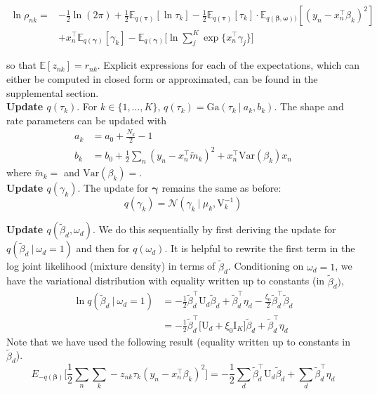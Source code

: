 \documentclass[twoside,11pt]{article}
\newcommand{\tr}{\intercal}
\newcommand\given[1][]{\:#1\vert\:}
\newcommand{\transpose}[1]{#1^{\intercal}}
\newcommand{\nsum}{\sum\limits_{n}}
\newcommand{\ksum}{\sum\limits_{k}}
\newcommand{\boldbeta}{\boldsymbol\beta}
\newcommand{\boldgamma}{\boldsymbol\gamma}
\newcommand{\E}{\mathbb{E}}
\newcommand{\betad}{\tilde{\beta}_d}
\newcommand{\umat}{\mathrm{U}}
\newcommand{\var}[1]{\mathrm{Var}\left(#1\right)}
\begin{document}
\begin{equation} \label{eq:ln_rho_vs}
\begin{split}
 \ln \rho_{nk} = &-\frac{1}{2}\ln(2\pi) + \frac{1}{2} \E_{q(\boldsymbol\tau)}[ \ln \tau_k ] - \frac{1}{2} \E_{q(\boldsymbol\tau)}[\tau_k] \cdot \E_{q(\boldbeta, \boldsymbol\omega))}[(y_n - x_n^{\tr}\beta_k)^2] \\ 
	& + x_n^{\tr}\E_{q(\boldsymbol\gamma)}[\gamma_k] - \E_{q(\boldsymbol\gamma)}\Bigg[\ln \sum_{j}^K \exp \{ x_n^{\tr} \gamma_j \}\Bigg]
\end{split}
\end{equation}

so that $\E[z_{nk}] = r_{nk}$. Explicit expressions for each of the expectations, which can either be computed in closed form or approximated, can be found in the supplemental section. \\


\textbf{Update $q \left(  \tau_k \right)$}. For $k \in \{1, \ldots, K \}$, $q(\tau_k) = \mathrm{Ga}\left( \tau_k \given a_k, b_k \right)$. The shape and rate parameters can be updated with
\begin{align}
	a_k &= a_0 + \frac{N_k}{2} - 1 \label{eq:ak_vs} \\
	b_k &= b_0 + \frac{1}{2} \nsum (y_n -\transpose{x_n} \tilde{m}_k)^2 + \transpose{x_n}\var{\beta_k} x_n \label{eq:bk_vs}
\end{align}
where $\tilde{m}_k = $ and $\var{\beta_k} = $. \\

\textbf{Update $q \left(  \gamma_k \right)$}. The update for $\boldgamma$ remains the same as before:
\begin{equation} \label{optimal_gmama_vs}
	q(\gamma_k) = \mathcal{N} \left( \gamma_k \given \mu_k, \mathrm{V}_k^{-1} \right)
\end{equation}



\textbf{Update $q ( \betad, \omega_d )$}. We do this sequentially by first deriving the update for $q\left(\betad \given \omega_d = 1 \right)$ and then for $q\left( \omega_d \right)$. It is helpful to rewrite the first term in the log joint likelihood (mixture density) in terms of $\betad$. Conditioning on $\omega_d = 1$, we have the variational distribution with equality written up to constants (in $\betad)$, 
\begin{align}
	 \ln q\left(\betad \given \omega_d = 1 \right) &= - \frac{1}{2} \transpose{\betad} \umat_d \betad + \transpose{\betad} \eta_d - \frac{\xi_0}{2} \transpose{\betad} \betad \\
	 &= - \frac{1}{2} \transpose{\betad} \big[ \umat_d +  \xi_0 \mathrm{I}_K\big] \betad + \transpose{\betad} \eta_d \label{eq:ln_q_beta_vs}
\end{align}
Note that we have used the following result (equality written up to constants in $\betad$). 
\begin{equation}
	 E_{-q(\boldbeta)} \Bigg[ \frac{1}{2} \nsum \ksum -z_{nk} \tau_k \left( y_n - \transpose{x_n} \beta_k \right)^2 \Bigg] = - \frac{1}{2} \sum_d \transpose{\betad} \umat_d \betad + \sum_{d} \transpose{\betad} \eta_d
\end{equation}
\end{document}
